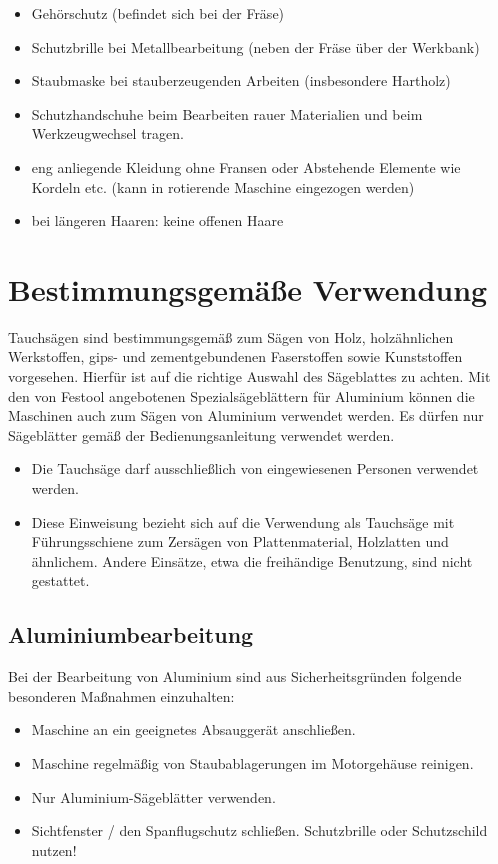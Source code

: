\documentclass{\basedir/fablab-document}
\begin{document}
\begin{itemize}
\item Gehörschutz (befindet sich bei der Fräse)
\item Schutzbrille bei Metallbearbeitung (neben der Fräse über der Werkbank)
\item Staubmaske bei stauberzeugenden Arbeiten (insbesondere Hartholz)
\item Schutzhandschuhe beim Bearbeiten rauer Materialien und beim Werkzeugwechsel tragen.
\item eng anliegende Kleidung ohne Fransen oder Abstehende Elemente wie Kordeln etc. (kann in rotierende Maschine eingezogen werden)
\item bei längeren Haaren: keine offenen Haare
\end{itemize}

\section{Bestimmungsgemäße Verwendung}
Tauchsägen sind bestimmungsgemäß zum Sägen von Holz, holzähnlichen Werkstoffen, gips- und zementgebundenen Faserstoffen sowie Kunststoffen vorgesehen. Hierfür ist auf die richtige Auswahl des Sägeblattes zu achten. Mit den von Festool angebotenen Spezialsägeblättern für Aluminium können die Maschinen auch zum Sägen von Aluminium verwendet werden. Es dürfen nur Sägeblätter gemäß der Bedienungsanleitung verwendet werden.
\begin{itemize}
\item Die Tauchsäge darf ausschließlich von eingewiesenen Personen verwendet werden.
\item Diese Einweisung bezieht sich auf die Verwendung als Tauchsäge mit Führungsschiene zum Zersägen von Plattenmaterial, Holzlatten und ähnlichem. Andere Einsätze, etwa die freihändige Benutzung, sind nicht gestattet.
\end{itemize}

\subsection{Aluminiumbearbeitung}
Bei der Bearbeitung von Aluminium sind aus Sicherheitsgründen folgende besonderen Maßnahmen einzuhalten:
\begin{itemize}
\item Maschine an ein geeignetes Absauggerät anschließen.
\item Maschine regelmäßig von Staubablagerungen im Motorgehäuse reinigen.
\item Nur Aluminium-Sägeblätter verwenden.
\item Sichtfenster / den Spanflugschutz schließen. Schutzbrille oder Schutzschild nutzen!
\end{itemize}
\end{document}
